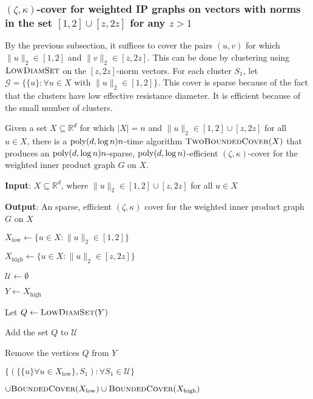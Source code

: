 \subsubsection{\texorpdfstring{$(\zeta,\kappa)$}{}-cover for weighted IP graphs on vectors with norms in the set \texorpdfstring{$[1,2]\cup [z,2z]$}{} for any \texorpdfstring{$z > 1$}{}}

By the previous subsection, it suffices to cover the pairs $(u,v)$ for which $\|u\|_2\in [1,2]$ and $\|v\|_2\in [z,2z]$. This can be done by clustering using $\textsc{LowDiamSet}$ on the $[z,2z]$-norm vectors. For each cluster $S_1$, let $\mathcal G = \{\{u\}: \forall u\in X \text{ with } \|u\|_2\in [1,2]\}$. This cover is sparse because of the fact that the clusters have low effective resistance diameter. It is efficient because of the small number of clusters.

\begin{proposition}\label{prop:two-bounded-cover}
Given a set $X\subseteq \mathbb{R}^d$ for which $|X| = n$ and $\|u\|_2\in [1,2]\cup [z,2z]$ for all $u\in X$, there is a $\mathrm{poly}(d,\log n) n$-time algorithm $\textsc{TwoBoundedCover}(X)$ that produces an $\mathrm{poly}(d,\log n) n$-sparse, $\mathrm{poly}(d,\log n)$-efficient $(\zeta,\kappa)$-cover for the weighted inner product graph $G$ on $X$.
\end{proposition}

\begin{algorithm}[!h]\caption{}
\begin{algorithmic}[1]

    \State \textbf{Input}: $X\subseteq \mathbb{R}^d$, where $\|u\|_2\in [1,2]\cup [z,2z]$ for all $u\in X$
    
    \State \textbf{Output}: An sparse, efficient $(\zeta,\kappa)$ cover for the weighted inner product graph $G$ on $X$
    
    \State $X_{\text{low}}\gets \{u\in X: \|u\|_2\in [1,2]\}$
    
    \State $X_{\text{high}}\gets \{u\in X: \|u\|_2\in [z,2z]\}$
    
    \State $\mathcal U \gets \emptyset$
    
    \State $Y\gets X_{\text{high}}$
    
    
        \State Let $Q\gets \textsc{LowDiamSet}(Y)$
    
        \State Add the set $Q$ to $\mathcal U$
        
        \State Remove the vertices $Q$ from $Y$
        
    \EndWhile
    
    \State \Return $\{(\{\{u\} \forall u\in X_{\text{low}}\}, S_1): \forall S_1\in \mathcal U\}$
    
    \State $ \cup \textsc{BoundedCover}(X_{\text{low}}) \cup \textsc{BoundedCover}(X_{\text{high}})$
    
\EndProcedure
\end{algorithmic}
\end{algorithm}

